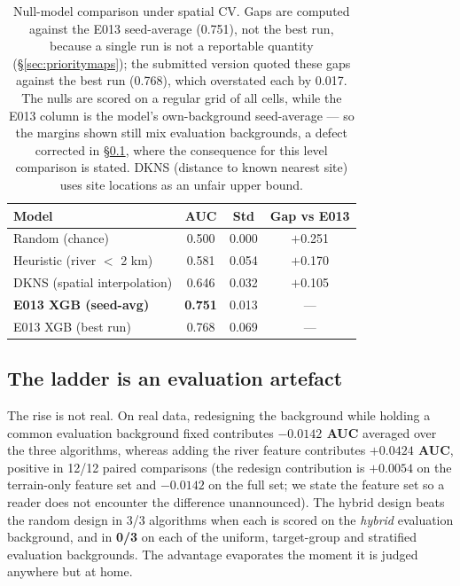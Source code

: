 \documentclass[12pt]{article}
\begin{document}
\begin{table}[h]
\centering
\small
\begin{tabular}{lccc}
\toprule
Model & AUC & Std & Gap vs E013 \\
\midrule
Random (chance)              & 0.500 & 0.000 & $+$0.251 \\
Heuristic (river $<$ 2 km)   & 0.581 & 0.054 & $+$0.170 \\
DKNS (spatial interpolation) & 0.646 & 0.032 & $+$0.105 \\
\textbf{E013 XGB (seed-avg)} & \textbf{0.751} & 0.013 & --- \\
E013 XGB (best run)          & 0.768 & 0.069 & --- \\
\bottomrule
\end{tabular}
\caption{Null-model comparison under spatial CV. Gaps are computed against the E013 seed-average (0.751), not the best run, because a single run is not a reportable quantity (\S\ref{sec:prioritymaps}); the submitted version quoted these gaps against the best run (0.768), which overstated each by 0.017. The nulls are scored on a regular grid of all cells, while the E013 column is the model's own-background seed-average --- so the margins shown still mix evaluation backgrounds, a defect corrected in \S\ref{sec:artefact}, where the consequence for this level comparison is stated. DKNS (distance to known nearest site) uses site locations as an unfair upper bound.}
\label{tab:nullmodel}
\end{table}

\subsection{The ladder is an evaluation artefact}
\label{sec:artefact}

The rise is not real.
On real data, redesigning the background while holding a common evaluation background fixed contributes \textbf{$-0.0142$ AUC} averaged over the three algorithms, whereas adding the river feature contributes \textbf{$+0.0424$ AUC}, positive in 12/12 paired comparisons (the redesign contribution is $+0.0054$ on the terrain-only feature set and $-0.0142$ on the full set; we state the feature set so a reader does not encounter the difference unannounced).
The hybrid design beats the random design in 3/3 algorithms when each is scored on the \emph{hybrid} evaluation background, and in \textbf{0/3} on each of the uniform, target-group and stratified evaluation backgrounds.
The advantage evaporates the moment it is judged anywhere but at home.
\end{document}
